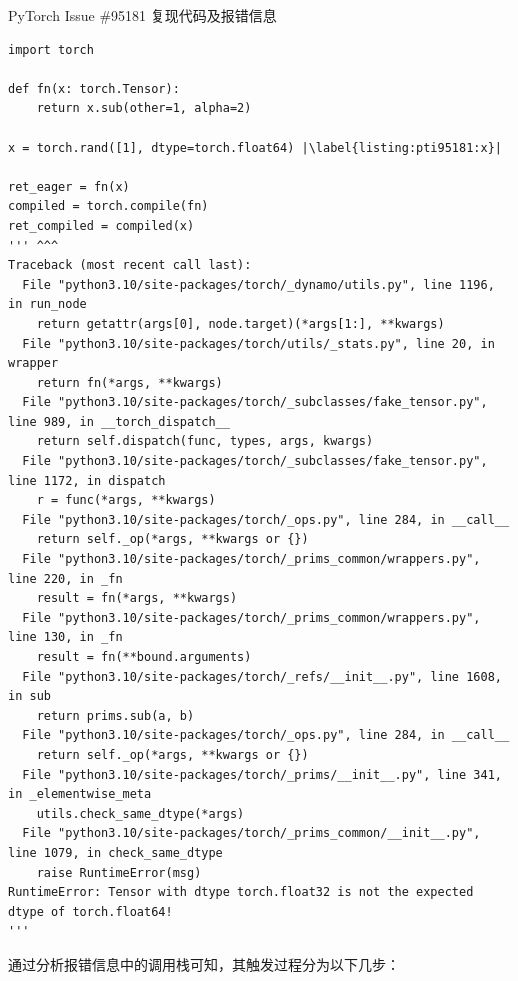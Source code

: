 \begin{listing}[]
    \caption{PyTorch Issue \#95181 复现代码及报错信息}
    \label{listing:pti95181}
\begin{verbatim}
import torch

def fn(x: torch.Tensor):
    return x.sub(other=1, alpha=2)

x = torch.rand([1], dtype=torch.float64) |\label{listing:pti95181:x}|

ret_eager = fn(x)
compiled = torch.compile(fn)
ret_compiled = compiled(x)
''' ^^^
Traceback (most recent call last):
  File "python3.10/site-packages/torch/_dynamo/utils.py", line 1196, in run_node
    return getattr(args[0], node.target)(*args[1:], **kwargs)
  File "python3.10/site-packages/torch/utils/_stats.py", line 20, in wrapper
    return fn(*args, **kwargs)
  File "python3.10/site-packages/torch/_subclasses/fake_tensor.py", line 989, in __torch_dispatch__
    return self.dispatch(func, types, args, kwargs)
  File "python3.10/site-packages/torch/_subclasses/fake_tensor.py", line 1172, in dispatch
    r = func(*args, **kwargs)
  File "python3.10/site-packages/torch/_ops.py", line 284, in __call__
    return self._op(*args, **kwargs or {})
  File "python3.10/site-packages/torch/_prims_common/wrappers.py", line 220, in _fn
    result = fn(*args, **kwargs)
  File "python3.10/site-packages/torch/_prims_common/wrappers.py", line 130, in _fn
    result = fn(**bound.arguments)
  File "python3.10/site-packages/torch/_refs/__init__.py", line 1608, in sub
    return prims.sub(a, b)
  File "python3.10/site-packages/torch/_ops.py", line 284, in __call__
    return self._op(*args, **kwargs or {})
  File "python3.10/site-packages/torch/_prims/__init__.py", line 341, in _elementwise_meta
    utils.check_same_dtype(*args)
  File "python3.10/site-packages/torch/_prims_common/__init__.py", line 1079, in check_same_dtype
    raise RuntimeError(msg)
RuntimeError: Tensor with dtype torch.float32 is not the expected dtype of torch.float64!
'''
\end{verbatim}
\end{listing}

通过分析报错信息中的调用栈可知，其触发过程分为以下几步：

